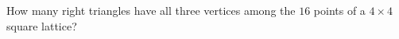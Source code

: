 How many right triangles have all three vertices among the $16$ points of a $4\times4$ square lattice?
